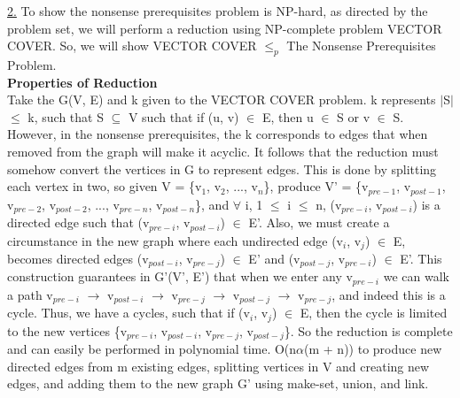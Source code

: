 \documentclass[10pt]{csc_assignment}
\begin{document}
\begin{description}
\underline{2.} To show the nonsense prerequisites problem is NP-hard, as directed by the problem set, we will perform a reduction using NP-complete problem VECTOR COVER. So, we will show VECTOR COVER $\leqslant_{p}$ The Nonsense Prerequisites Problem.\\

\textbf{Properties of Reduction}\\
Take the G(V, E) and k given to the VECTOR COVER problem. k represents $\mid$S$\mid$ $\leqslant$ k, such that S $\subseteq$ V such that if (u, v) $\in$ E, then u $\in$ S or v $\in$ S. However, in the nonsense prerequisites, the k corresponds to edges that when removed from the graph will make it acyclic. It follows that the reduction must somehow convert the vertices in G to represent edges. This is done by splitting each vertex in two, so given V = \{v$_{1}$, v$_{2}$, ..., v$_{n}$\}, produce V' = \{v$_{pre-1}$, v$_{post-1}$, v$_{pre-2}$, v$_{post-2}$, ..., v$_{pre-n}$, v$_{post-n}$\}, and $\forall$ i, 1 $\leqslant$ i $\leqslant$ n, (v$_{pre-i}$, v$_{post-i}$) is a directed edge such that (v$_{pre-i}$, v$_{post-i}$) $\in$  E'. Also, we must create a circumstance in the new graph where each undirected edge (v$_{i}$, v$_{j}$) $\in$ E, becomes directed edges (v$_{post-i}$, v$_{pre-j}$) $\in$ E' and (v$_{post-j}$, v$_{pre-i}$) $\in$ E'. This construction guarantees in G'(V', E') that when we enter any v$_{pre-i}$ we can walk a path v$_{pre-i}$ $\rightarrow$ v$_{post-i}$ $\rightarrow$ v$_{pre-j}$ $\rightarrow$ v$_{post-j}$ $\rightarrow$ v$_{pre-j}$, and indeed this is a cycle. Thus, we have a cycles, such that if (v$_{i}$, v$_{j}$) $\in$ E, then the cycle is limited to the new vertices \{v$_{pre-i}$, v$_{post-i}$, v$_{pre-j}$, v$_{post-j}$\}. So the reduction is complete and can easily be performed in polynomial time. O(n$\alpha$(m + n)) to produce new directed edges from m existing edges, splitting vertices in V and creating new edges, and adding them to the new graph G' using make-set, union, and link.\\


\end{description}
\end{document}
